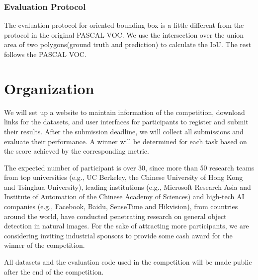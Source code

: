 \documentclass[a4paper]{article}
\begin{document}
\subsubsection*{Evaluation Protocol}
The evaluation protocol for oriented bounding box is a little different from the protocol in the original PASCAL VOC. We use the intersection over the union area of two polygons(ground truth and prediction) to calculate the IoU. The rest follows the PASCAL VOC.

\section{Organization}
We will set up a website to maintain information of the competition, download links for the datasets, and user interfaces for participants to register and submit their results. After the submission deadline, we will collect all submissions and evaluate their performance. A winner will be determined for each task based on the score achieved by the corresponding metric.

The expected number of participant is over 30, since more than 50 research teams from top universities (e.g., UC Berkeley, the Chinese University of Hong Kong and Tsinghua University), leading institutions (e.g., Microsoft Research Asia and Institute of Automation of the Chinese Academy of Sciences) and high-tech AI companies (e.g., Facebook, Baidu, SenseTime and Hikvision), from countries around the world, have conducted penetrating research on general object detection in natural images. For the sake of attracting more participants, we are considering inviting industrial sponsors to provide some cash award for the winner of the competition.

All datasets and the evaluation code used in the competition will be made public after the end of the competition.
\end{document}
